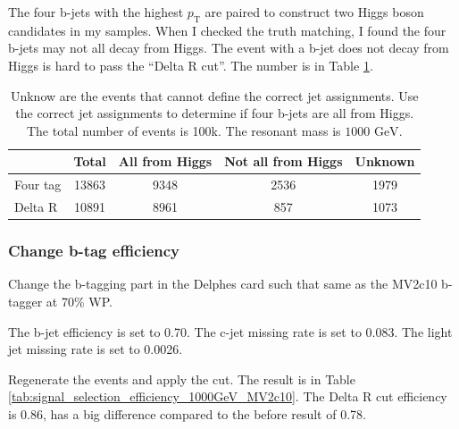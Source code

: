 \documentclass[12pt]{article}
\begin{document}
		The four b-jets with the highest $p_\text{T}$ are paired to construct two Higgs boson candidates in my samples. When I checked the truth matching, I found the four b-jets may not all decay from Higgs. The event with a b-jet does not decay from Higgs is hard to pass the ``Delta R cut''. The number is in Table \ref{tab:signal_selection_compared_whit_truth_matching_1000GeV}. 
			\begin{table}[htpb]
				\centering
				\caption{Unknow are the events that cannot define the correct jet assignments. Use the correct jet assignments to determine if four b-jets are all from Higgs. The total number of events is 100k. The resonant mass is $\text{1000 GeV}$.}
				\label{tab:signal_selection_compared_whit_truth_matching_1000GeV}
				\begin{tabular}{l|c|ccc}
							 & Total & All from Higgs & Not all from Higgs & Unknown\\ \hline
					Four tag & 13863 & 9348    & 2536  & 1979   \\
					Delta R  & 10891 & 8961    & 857   & 1073    
				\end{tabular}
			\end{table}

		\subsubsection{Change b-tag efficiency}%
		\label{subs:change_b_tag_efficiency}
			Change the b-tagging part in the Delphes card such that same as the MV2c10 b-tagger at 70\% WP. 

			The b-jet efficiency is set to 0.70. The c-jet missing rate is set to 0.083. The light jet missing rate is set to 0.0026.

			Regenerate the events and apply the cut. The result is in Table \ref{tab:signal_selection_efficiency_1000GeV_MV2c10}. The Delta R cut efficiency is 0.86, has a big difference compared to the before result of 0.78.
\end{document}
